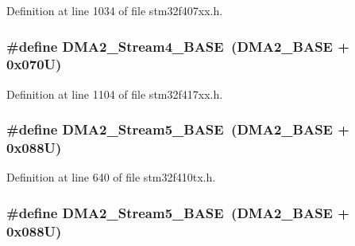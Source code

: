 Definition at line 1034 of file stm32f407xx.\+h.

\subsubsection[{\texorpdfstring{D\+M\+A2\+\_\+\+Stream4\+\_\+\+B\+A\+SE}{DMA2_Stream4_BASE}}]{\setlength{\rightskip}{0pt plus 5cm}\#define D\+M\+A2\+\_\+\+Stream4\+\_\+\+B\+A\+SE~({\bf D\+M\+A2\+\_\+\+B\+A\+SE} + 0x070\+U)}\hypertarget{group___peripheral__registers__structures_gad1e67740e6301233473f64638145dd1f}{}\label{group___peripheral__registers__structures_gad1e67740e6301233473f64638145dd1f}


Definition at line 1104 of file stm32f417xx.\+h.

\subsubsection[{\texorpdfstring{D\+M\+A2\+\_\+\+Stream5\+\_\+\+B\+A\+SE}{DMA2_Stream5_BASE}}]{\setlength{\rightskip}{0pt plus 5cm}\#define D\+M\+A2\+\_\+\+Stream5\+\_\+\+B\+A\+SE~({\bf D\+M\+A2\+\_\+\+B\+A\+SE} + 0x088\+U)}\hypertarget{group___peripheral__registers__structures_gaed1460fdc407b6decfbffccb0260d0af}{}\label{group___peripheral__registers__structures_gaed1460fdc407b6decfbffccb0260d0af}


Definition at line 640 of file stm32f410tx.\+h.

\subsubsection[{\texorpdfstring{D\+M\+A2\+\_\+\+Stream5\+\_\+\+B\+A\+SE}{DMA2_Stream5_BASE}}]{\setlength{\rightskip}{0pt plus 5cm}\#define D\+M\+A2\+\_\+\+Stream5\+\_\+\+B\+A\+SE~({\bf D\+M\+A2\+\_\+\+B\+A\+SE} + 0x088\+U)}\hypertarget{group___peripheral__registers__structures_gaed1460fdc407b6decfbffccb0260d0af}{}\label{group___peripheral__registers__structures_gaed1460fdc407b6decfbffccb0260d0af}


